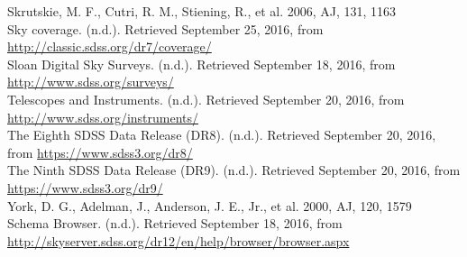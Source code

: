 \documentclass[10pt,letterpaper]{article}
\begin{document}
\begin{thebibliography}{1}
 Skrutskie, M. F., Cutri, R. M., Stiening, R., et al. 2006, AJ, 131, 1163\\

 Sky coverage. (n.d.). Retrieved September 25, 2016, from \url{http://classic.sdss.org/dr7/coverage/}\\

 Sloan Digital Sky Surveys. (n.d.). Retrieved September 18, 2016, from \url{http://www.sdss.org/surveys/}\\

 Telescopes and Instruments. (n.d.). Retrieved September 20, 2016, from \url{http://www.sdss.org/instruments/}\\

 The Eighth SDSS Data Release (DR8). (n.d.). Retrieved September 20, 2016, from \url{https://www.sdss3.org/dr8/}\\

 The Ninth SDSS Data Release (DR9). (n.d.). Retrieved September 20, 2016, from \url{https://www.sdss3.org/dr9/}\\

 York, D. G., Adelman, J., Anderson, J. E., Jr., et al. 2000, AJ, 120, 1579\\

 Schema Browser. (n.d.). Retrieved September 18, 2016, from \url{http://skyserver.sdss.org/dr12/en/help/browser/browser.aspx}\\

\end{thebibliography}
\end{document}
